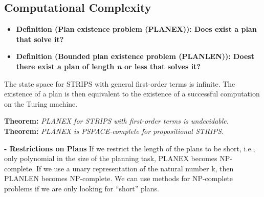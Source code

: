 \documentclass{article}
\begin{document}
\subsection{Computational Complexity}
\begin{itemize}
\item \textbf{Definition (Plan existence problem (PLANEX)): Does exist a plan that solve it?}
\item \textbf{Definition (Bounded plan existence problem (PLANLEN)): Doest there exist a plan of length \textit{n} or less that solves it?}
\end{itemize}
The state space for STRIPS with general first-order terms is infinite. The existence of a plan is then equivalent to the existence of a successful computation on the Turing machine. 
\begin{center}
\textbf{Theorem: }\textit{PLANEX for STRIPS with first-order terms is undecidable.}\\
\textbf{Theorem: }\textit{PLANEX is PSPACE-complete for propositional STRIPS.}
\end{center}
\textbf{- Restrictions on Plans}
If we restrict the length of the plans to be short, i.e., only polynomial in the size of the planning task, PLANEX becomes NP-complete. If we use a unary representation of the natural number k, then PLANLEN becomes NP-complete. We can use methods for NP-complete problems if we are only looking for “short” plans. 
\end{document}
